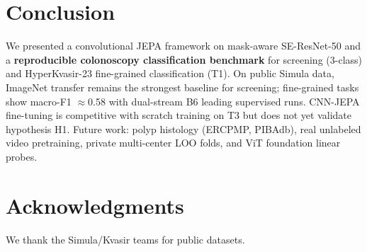 \section{Conclusion}
\label{sec:conclusion}

We presented a convolutional JEPA framework on mask-aware SE-ResNet-50 and a \textbf{reproducible colonoscopy classification benchmark} for screening (3-class) and HyperKvasir-23 fine-grained classification (T1).
On public Simula data, ImageNet transfer remains the strongest baseline for screening; fine-grained tasks show macro-F1 $\approx$0.58 with dual-stream B6 leading supervised runs.
CNN-JEPA fine-tuning is competitive with scratch training on T3 but does not yet validate hypothesis H1.
Future work: polyp histology (ERCPMP, PIBAdb), real unlabeled video pretraining, private multi-center LOO folds, and ViT foundation linear probes.

\section*{Acknowledgments}
We thank the Simula/Kvasir teams for public datasets.
